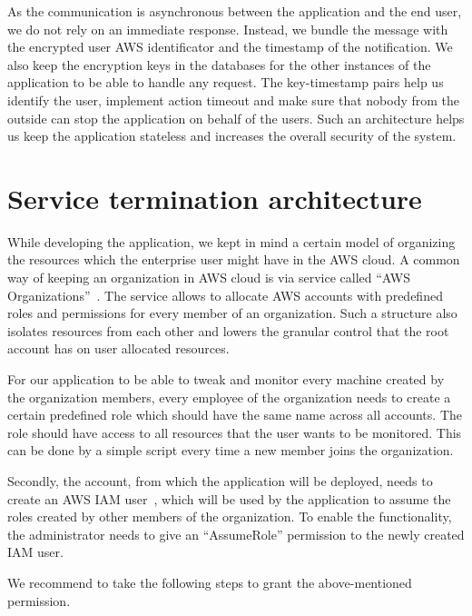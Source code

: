\documentclass[licencjacka,en]{thesisclass}
\begin{document}
    As the communication is asynchronous between the application and the end user,
    we do not rely on an immediate response.
    Instead, we bundle the message with the encrypted user AWS identificator
    and the timestamp of the notification.
    We also keep the encryption keys in the databases for the other instances
    of the application to be able to handle any request.
    The key-timestamp pairs help us identify the user, implement action timeout
    and make sure that nobody from the outside can stop the application
    on behalf of the users.
    Such an architecture helps us keep the application stateless
    and increases the overall security of the system.

    \section{Service termination architecture}
    While developing the application, we kept in mind a certain model
    of organizing the resources
    which the enterprise user might have in the AWS cloud.
    A common way of keeping an organization in AWS cloud
    is via service called “AWS Organizations”~\cite{AWSOrganizations}.
    The service allows to allocate AWS accounts
    with predefined roles and permissions for every member of an organization.
    Such a structure also isolates resources from each other
    and lowers the granular control that the root account has on user allocated resources.

    For our application to be able to tweak and monitor every machine
    created by the organization members, every employee of the organization
    needs to create a certain predefined role
    which should have the same name across all accounts.
    The role should have access to all resources that the user wants to be monitored.
    This can be done by a simple script every time a new member joins the organization.

    Secondly, the account, from which the application will be deployed,
    needs to create an AWS IAM user~\cite{AWSIAM},
    which will be used by the application to assume
    the roles created by other members of the organization.
    To enable the functionality, the administrator needs
    to give an “AssumeRole” permission to the newly created IAM user.

    We recommend to take the following steps to grant the above-mentioned permission.
\end{document}
